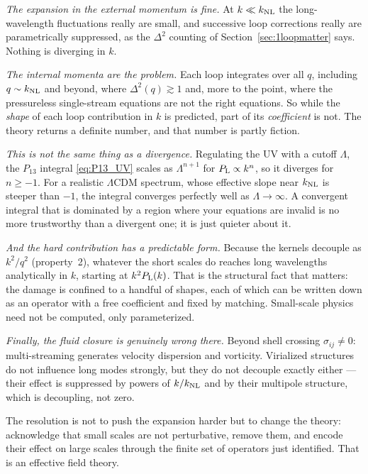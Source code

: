 \documentclass[a4paper,11pt]{article}
\def\Plin{P_{\rm L}}
\def\knl{k_{\rm NL}}
\def\lcdm{$\Lambda$CDM}
\numberwithin{equation}{section}
\begin{document}
\emph{The expansion in the external momentum is fine.} At $k \ll \knl$ the long-wavelength fluctuations really are small, and successive loop corrections really are parametrically suppressed, as the $\Delta^2$ counting of Section~\ref{sec:1loopmatter} says. Nothing is diverging in $k$.

\emph{The internal momenta are the problem.} Each loop integrates over all $q$, including $q \sim \knl$ and beyond, where $\Delta^2(q) \gtrsim 1$ and, more to the point, where the pressureless single-stream equations are not the right equations. So while the \emph{shape} of each loop contribution in $k$ is predicted, part of its \emph{coefficient} is not. The theory returns a definite number, and that number is partly fiction.

\emph{This is not the same thing as a divergence.} Regulating the UV with a cutoff $\Lambda$, the $P_{13}$ integral \eqref{eq:P13_UV} scales as $\Lambda^{n+1}$ for $\Plin \propto k^n$, so it diverges for $n \ge -1$. For a realistic \lcdm{} spectrum, whose effective slope near $\knl$ is steeper than $-1$, the integral converges perfectly well as $\Lambda\to\infty$. A convergent integral that is dominated by a region where your equations are invalid is no more trustworthy than a divergent one; it is just quieter about it.

\emph{And the hard contribution has a predictable form.} Because the kernels decouple as $k^2/q^2$ (property~2), whatever the short scales do reaches long wavelengths analytically in $k$, starting at $k^2\Plin(k)$. That is the structural fact that matters: the damage is confined to a handful of shapes, each of which can be written down as an operator with a free coefficient and fixed by matching. Small-scale physics need not be computed, only parameterized.

\emph{Finally, the fluid closure is genuinely wrong there.} Beyond shell crossing $\sigma_{ij} \neq 0$: multi-streaming generates velocity dispersion and vorticity. Virialized structures do not influence long modes strongly, but they do not decouple exactly either --- their effect is suppressed by powers of $k/\knl$ and by their multipole structure, which is decoupling, not zero.

The resolution is not to push the expansion harder but to change the theory: acknowledge that small scales are not perturbative, remove them, and encode their effect on large scales through the finite set of operators just identified. That is an effective field theory.
\end{document}
